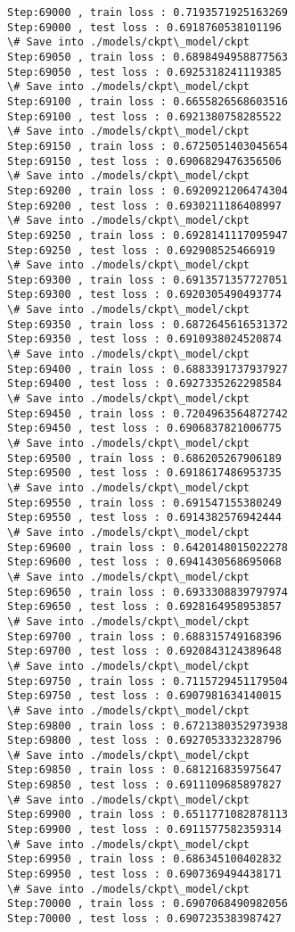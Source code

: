 \documentclass[11pt]{article}
\begin{document}
\begin{Verbatim}[commandchars=\\\{\}]
Step:69000 , train loss : 0.7193571925163269
Step:69000 , test loss : 0.6918760538101196
\# Save into ./models/ckpt\_model/ckpt
Step:69050 , train loss : 0.6898494958877563
Step:69050 , test loss : 0.6925318241119385
\# Save into ./models/ckpt\_model/ckpt
Step:69100 , train loss : 0.6655826568603516
Step:69100 , test loss : 0.6921380758285522
\# Save into ./models/ckpt\_model/ckpt
Step:69150 , train loss : 0.6725051403045654
Step:69150 , test loss : 0.6906829476356506
\# Save into ./models/ckpt\_model/ckpt
Step:69200 , train loss : 0.6920921206474304
Step:69200 , test loss : 0.6930211186408997
\# Save into ./models/ckpt\_model/ckpt
Step:69250 , train loss : 0.6928141117095947
Step:69250 , test loss : 0.692908525466919
\# Save into ./models/ckpt\_model/ckpt
Step:69300 , train loss : 0.6913571357727051
Step:69300 , test loss : 0.6920305490493774
\# Save into ./models/ckpt\_model/ckpt
Step:69350 , train loss : 0.6872645616531372
Step:69350 , test loss : 0.6910938024520874
\# Save into ./models/ckpt\_model/ckpt
Step:69400 , train loss : 0.6883391737937927
Step:69400 , test loss : 0.6927335262298584
\# Save into ./models/ckpt\_model/ckpt
Step:69450 , train loss : 0.7204963564872742
Step:69450 , test loss : 0.6906837821006775
\# Save into ./models/ckpt\_model/ckpt
Step:69500 , train loss : 0.686205267906189
Step:69500 , test loss : 0.6918617486953735
\# Save into ./models/ckpt\_model/ckpt
Step:69550 , train loss : 0.691547155380249
Step:69550 , test loss : 0.6914382576942444
\# Save into ./models/ckpt\_model/ckpt
Step:69600 , train loss : 0.6420148015022278
Step:69600 , test loss : 0.6941430568695068
\# Save into ./models/ckpt\_model/ckpt
Step:69650 , train loss : 0.6933308839797974
Step:69650 , test loss : 0.6928164958953857
\# Save into ./models/ckpt\_model/ckpt
Step:69700 , train loss : 0.688315749168396
Step:69700 , test loss : 0.6920843124389648
\# Save into ./models/ckpt\_model/ckpt
Step:69750 , train loss : 0.7115729451179504
Step:69750 , test loss : 0.6907981634140015
\# Save into ./models/ckpt\_model/ckpt
Step:69800 , train loss : 0.6721380352973938
Step:69800 , test loss : 0.6927053332328796
\# Save into ./models/ckpt\_model/ckpt
Step:69850 , train loss : 0.681216835975647
Step:69850 , test loss : 0.6911109685897827
\# Save into ./models/ckpt\_model/ckpt
Step:69900 , train loss : 0.6511771082878113
Step:69900 , test loss : 0.6911577582359314
\# Save into ./models/ckpt\_model/ckpt
Step:69950 , train loss : 0.686345100402832
Step:69950 , test loss : 0.6907369494438171
\# Save into ./models/ckpt\_model/ckpt
Step:70000 , train loss : 0.6907068490982056
Step:70000 , test loss : 0.6907235383987427

\end{Verbatim}
\end{document}
